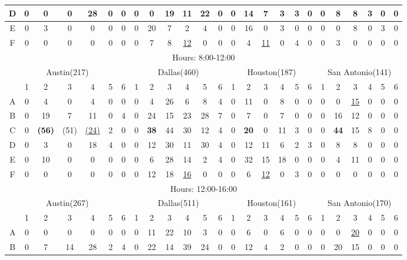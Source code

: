 \begin{table*}
\begin{tabular}{|c|c|c|c|c|c|c|c|c|c|c|c|c|c|c|c|c|c|c|c|c|c|c|c|c|}
\hline
D
& 0& 0& 0& 28& 0& 0
& 0& 0& 19& 11& 22& 0
& 0& 14& 7& 3& 3& 0
& 0& 8& 8& 3& 0& 0\\
\hline
E
& 0& 3& 0& 0& 0& 0
& 0& 20& 7& 2& 4& 0
& 0& 16& 0& 3& 0& 0 
& 0& 0& 8& 0& 3& 0\\
\hline
F
& 0& 0& 0& 0& 0& 0 
& 0& 7& 8& \underline{12}& 0& 0
& 0& 4& \underline{11}& 0& 4& 0
& 0& 3& 0& 0& 0& 0\\
\hline	
\hline	
\multicolumn{25}{|c|}{Hours: 8:00-12:00} 	\\
\hline	
\multicolumn{7}{|c|}{Austin(217)} 	&
\multicolumn{6}{c|}{Dallas(460)} 	&
\multicolumn{6}{c|}{Houston(187)} 	&
\multicolumn{6}{c|}{San Antonio(141)} 	\\
\hline	
\hline	
 & 1 &2 & 3 & 4 & 5&6 	
 & 1 &2 & 3 & 4 & 5&6 	
 & 1 &2 & 3 & 4 & 5&6 	
 & 1 &2 & 3 & 4 & 5&6 \\	
\hline
A
& 0& 4& 0& 4& 0& 0 
& 0& 4& 26& 6& 8& 4
& 0& 11& 0& 8& 0& 0 
& 0& 0& \underline{15}& 0& 0& 0\\
\hline
B
& 0& 19& 7& 11& 0& 4
& 0& 24& 15& 23& 28& 7
& 0& 7& 0& 7& 0& 0
& 0& 16& 12& 0& 0& 0 \\
\hline
C
& 0& \textbf{(56)}& (51)& \underline{(24)}& 2& 0
& 0&\textbf{38}& 44& 30& 12& 4 
& 0& \textbf{20}& 0& 11& 3& 0
& 0& \textbf{44}& 15& 8& 0& 0 \\
\hline
D
& 0& 3& 0& 18& 4& 0
& 0& 12& 30& 11& 30& 4 
& 0& 12& 11& 6& 2& 3 
& 0& 8& 8& 0& 0& 0 \\
\hline
E
& 0& 10& 0& 0& 0& 0
& 0& 6& 28& 14& 2& 4
& 0& 32& 15& 18& 0& 0
& 0& 4& 11& 0& 0& 0 \\
\hline
F
& 0& 0& 0& 0& 0& 0
& 0& 12& 18& \underline{16}& 0& 0
& 0& 6& \underline{12}& 0& 3& 0 
& 0& 0& 0& 0& 0& 0 \\
\hline
\hline	
\multicolumn{25}{|c|}{Hours: 12:00-16:00} 	\\
\hline	
\multicolumn{7}{|c|}{Austin(267)} 	&
\multicolumn{6}{c|}{Dallas(511)} 	&
\multicolumn{6}{c|}{Houston(161)} 	&
\multicolumn{6}{c|}{San Antonio(170)} 	\\
\hline	
\hline	
 & 1 &2 & 3 & 4 & 5&6 	
 & 1 &2 & 3 & 4 & 5&6 	
 & 1 &2 & 3 & 4 & 5&6 	
 & 1 &2 & 3 & 4 & 5&6 \\	
\hline
A
& 0& 0& 0& 0& 0& 0 
& 0& 11& 22& 10& 3& 0 
& 0& 6& 0& 6& 0& 0
& 0& 0& \underline{20}& 0& 0& 0\\
\hline
B
& 0& 7& 14& 28& 2& 4
& 0& 22& 14& 39& 24& 0 
& 0& 12& 4& 2& 0& 0
& 0& 20& 15& 0& 0& 0 \\

\end{tabular}
\end{table*}
